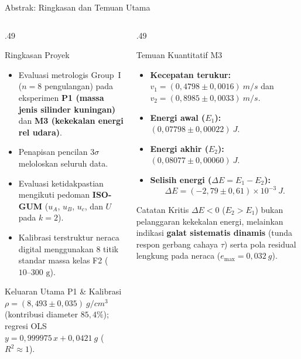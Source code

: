 \documentclass[aspectratio=169,10pt]{beamer}
\newcommand{\sm}{\fontsize{8.2}{10.2}\selectfont}
\newcommand{\uc}{u_{c}}
\newcommand{\uA}{u_{A}}
\newcommand{\uB}{u_{B}}
\begin{document}
\begin{frame}{Abstrak: Ringkasan dan Temuan Utama}
\begin{columns}[T,onlytextwidth]
\begin{column}{.49\textwidth}
\begin{block}{Ringkasan Proyek}\sm
\begin{itemize}
\item Evaluasi metrologis Group~I ($n=8$ pengulangan) pada eksperimen \textbf{P1 (massa jenis silinder kuningan)} dan \textbf{M3 (kekekalan energi rel udara)}.
\item Penapisan pencilan $3\sigma$ meloloskan seluruh data.
\item Evaluasi ketidakpastian mengikuti pedoman \textbf{ISO-GUM} ($\uA$, $\uB$, $\uc$, dan $U$ pada $k=2$).
\item Kalibrasi terstruktur neraca digital menggunakan $8$ titik standar massa kelas F2 ($10\text{--}300\text{ g}$).
\end{itemize}
\end{block}
\begin{exampleblock}{Keluaran Utama P1 \& Kalibrasi}\sm
$\rho = (8{,}493 \pm 0{,}035)\ \si{g/cm^3}$ (kontribusi diameter $85{,}4\%$); regresi OLS $y = 0{,}999975\,x + 0{,}0421\ \si{g}$ ($R^2 \approx 1$).
\end{exampleblock}
\end{column}

\begin{column}{.49\textwidth}
\begin{block}{Temuan Kuantitatif M3}\sm
\begin{itemize}
\item \textbf{Kecepatan terukur:} $v_1 = (0{,}4798 \pm 0{,}0016)\ \si{m/s}$ dan $v_2 = (0{,}8985 \pm 0{,}0033)\ \si{m/s}$.
\item \textbf{Energi awal ($E_1$):} $(0{,}07798 \pm 0{,}00022)\ \si{J}$.
\item \textbf{Energi akhir ($E_2$):} $(0{,}08077 \pm 0{,}00060)\ \si{J}$.
\item \textbf{Selisih energi ($\Delta E = E_1 - E_2$):}
  $$\Delta E = (-2{,}79 \pm 0{,}61) \times 10^{-3}\ \si{J}.$$
\end{itemize}
\end{block}
\begin{alertblock}{Catatan Kritis}\sm
$\Delta E < 0$ ($E_2 > E_1$) bukan pelanggaran kekekalan energi, melainkan indikasi \textbf{galat sistematis dinamis} (tunda respon gerbang cahaya $\tau$) serta pola residual lengkung pada neraca ($e_{\max} = 0{,}032\ \si{g}$).
\end{alertblock}
\end{column}
\end{columns}
\end{frame}
\end{document}
